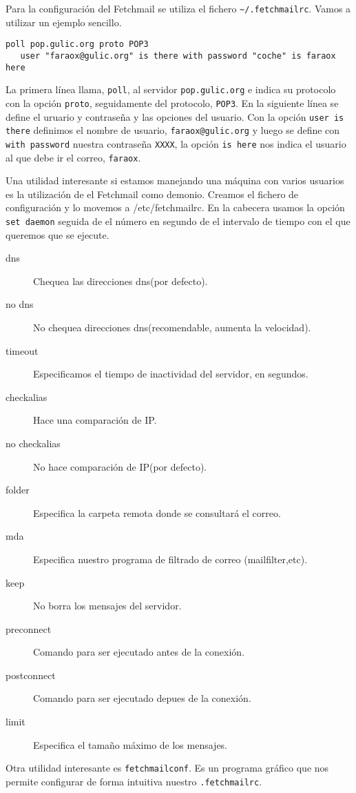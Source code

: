 Para  la  configuración del  {\sf  Fetchmail}  se utiliza  el  fichero
\verb|~/.fetchmailrc|. Vamos a utilizar un ejemplo sencillo.

\begin{verbatim}
poll pop.gulic.org proto POP3 
   user "faraox@gulic.org" is there with password "coche" is faraox here 
\end{verbatim}

La primera línea llama, {\tt  poll}, al servidor {\tt pop.gulic.org} e
indica  su  protocolo con  la  opción  {\tt proto},  seguidamente  del
protocolo, {\tt  POP3}. En la siguiente  línea se define el  uruario y
contraseña y  las opciones  del usuario.  Con la  opción {\tt  user is
there} definimos el nombre de  usuario, {\tt faraox@gulic.org} y luego
se define  con {\tt with  password} nuestra contraseña {\tt  XXXX}, la
opción {\tt is here}  nos indica el usuario al que  debe ir el correo,
{\tt faraox}.


Una utilidad interesante  si estamos manejando una  máquina con varios
usuarios es la utilización de el {\sf Fetchmail} como demonio. Creamos
el fichero  de configuración  y lo movemos  a /etc/fetchmailrc.  En la
cabecera usamos  la opción {\tt  set daemon}  seguida de el  número en
segundo de el intervalo de tiempo con el que queremos que se ejecute.

\begin{description}

\item[dns] Chequea las direcciones dns(por defecto).

\item[no  dns] No  chequea  direcciones  dns(recomendable, aumenta  la
velocidad).

\item[timeout] Especificamos el tiempo de inactividad del servidor, en
segundos.

\item[checkalias] Hace una comparación de IP.

\item[no checkalias] No hace comparación de IP(por defecto).

\item[folder]  Especifica la  carpeta  remota donde  se consultará  el
correo.

\item[mda]  Especifica   nuestro  programa   de  filtrado   de  correo
(mailfilter,etc).

\item[keep] No borra los mensajes del servidor.

\item [preconnect] Comando para ser ejecutado antes de la conexión.

\item[postconnect] Comando para ser ejecutado depues de la conexión.

\item[limit] Especifica el tamaño máximo de los mensajes.

\end{description}

Otra  utilidad  interesante es  {\tt  fetchmailconf}.  Es un  programa
gráfico  que  nos  permite   configurar  de  forma  intuitiva  nuestro
{\tt .fetchmailrc}.
